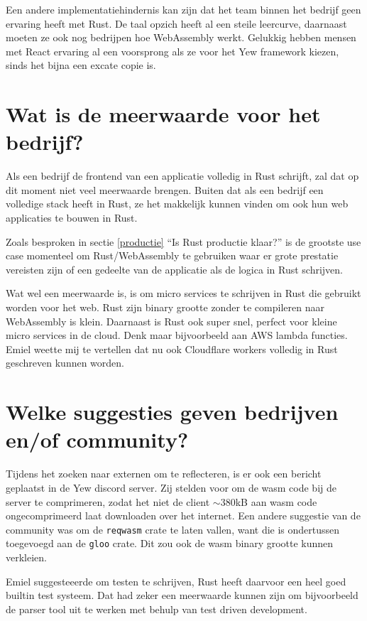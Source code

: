 Een andere implementatiehindernis kan zijn dat het team binnen het bedrijf geen ervaring heeft met
Rust. De taal opzich heeft al een steile leercurve, daarnaast moeten ze ook nog bedrijpen hoe
WebAssembly werkt. Gelukkig hebben mensen met React ervaring al een voorsprong als ze voor het Yew
framework kiezen, sinds het bijna een excate copie is.

\section{Wat is de meerwaarde voor het bedrijf?}

Als een bedrijf de frontend van een applicatie volledig in Rust schrijft, zal dat op dit moment niet
veel meerwaarde brengen. Buiten dat als een bedrijf een volledige stack heeft in Rust, ze het
makkelijk kunnen vinden om ook hun web applicaties te bouwen in Rust. 

Zoals besproken in sectie \ref{productie} \enquote{Is Rust productie klaar?} is de grootste use case
momenteel om Rust/WebAssembly te gebruiken waar er grote prestatie vereisten zijn of een gedeelte van
de applicatie als de logica in Rust schrijven.

Wat wel een meerwaarde is, is om micro services te schrijven in Rust die gebruikt worden voor het
web. Rust zijn binary grootte zonder te compileren naar WebAssembly is klein. Daarnaast is Rust ook
super snel, perfect voor kleine micro services in de cloud. Denk maar bijvoorbeeld aan AWS lambda
functies. Emiel weette mij te vertellen dat nu ook Cloudflare workers volledig in Rust geschreven
kunnen worden. \cite{cloudflare_workers}

\section{Welke suggesties geven bedrijven en/of community?}

Tijdens het zoeken naar externen om te reflecteren, is er ook een bericht geplaatst in de Yew
discord server. Zij stelden voor om de wasm code bij de server te comprimeren, zodat het niet de
client $\sim$380kB aan wasm code ongecomprimeerd laat downloaden over het internet. Een andere suggestie
van de community was om de \texttt{reqwasm} crate te laten vallen, want die is ondertussen
toegevoegd aan de \texttt{gloo} crate. Dit zou ook de wasm binary grootte kunnen
verkleien.

Emiel suggesteeerde om testen te schrijven, Rust heeft daarvoor een heel goed builtin test systeem.
Dat had zeker een meerwaarde kunnen zijn om bijvoorbeeld de parser tool uit te werken met behulp van
test driven development.

